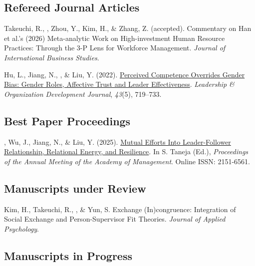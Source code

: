 \cvpubheading

\subsection*{Refereed Journal Articles}

\begin{entries}
    \entn{}Takeuchi, R., \eqc, Zhou, Y.\eqc, Kim, H., \& Zhang, Z. (accepted). Commentary on Han et al.’s (2026) Meta-analytic Work on High-investment Human Resource Practices: Through the 3-P Lens for Workforce Management. \textit{Journal of International Business Studies}. 

    \entn{}Hu, L., Jiang, N., , \& Liu, Y. (2022). \href{https://doi.org/10.1108/LODJ-06-2021-0312}{Perceived Competence Overrides Gender Bias: Gender Roles, Affective Trust and Leader Effectiveness}. \textit{Leadership \& Organization Development Journal}, \textit{43}(5), 719--733.
\end{entries}


\subsection*{Best Paper Proceedings}

\begin{entries}
    \entn{}, Wu, J., Jiang, N., \& Liu, Y. (2025). \href{https://journals.aom.org/doi/abs/10.5465/AMPROC.2025.60bp}{Mutual Efforts Into Leader-Follower Relationship, Relational Energy, and Resilience}. In S. Taneja (Ed.), \textit{Proceedings of the  Annual Meeting of the Academy of Management}. Online ISSN: 2151-6561.
\end{entries}


\subsection*{Manuscripts under Review}

\begin{entries}
    \entn{}Kim, H.\eqc, Takeuchi, R.\eqc, , \& Yun, S. Exchange (In)congruence: Integration of Social Exchange and Person-Supervisor Fit Theories. \textit{Journal of Applied Psychology}. 
\end{entries}


\ifcvextended
\subsection*{Manuscripts in Progress}

